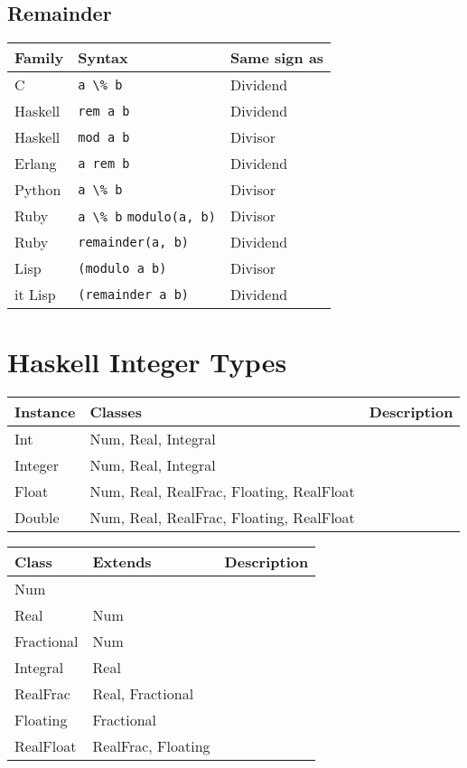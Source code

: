 \documentclass{article}
\begin{document}
\subsection{Remainder}
\begin{longtabu} to 0.75\linewidth { X X X }
	Family & Syntax & Same sign as \\
	\hline
	C & \lstinline$a \% b$ & Dividend \\
	Haskell & \lstinline$rem a b$ & Dividend \\
	Haskell & \lstinline$mod a b$ & Divisor \\
	Erlang & \lstinline$a rem b$ & Dividend \\
	Python & \lstinline$a \% b$ & Divisor \\
	Ruby & \lstinline$a \% b$ \newline \lstinline$modulo(a, b)$ & Divisor \\
	Ruby & \lstinline$remainder(a, b)$ & Dividend \\
	Lisp & \lstinline$(modulo a b)$ & Divisor \\it
	Lisp & \lstinline$(remainder a b)$ & Dividend \\

\end{longtabu}

\section{Haskell Integer Types}
\begin{longtabu} to 0.75\linewidth { X X X }
	Instance & Classes & Description \\
	\hline
	Int & Num, Real, Integral & \\
	Integer & Num, Real, Integral & \\
	Float & Num, Real, RealFrac, Floating, RealFloat & \\
	Double & Num, Real, RealFrac, Floating, RealFloat & \\
\end{longtabu}
\begin{longtabu} to 0.75\linewidth { X X X }
	Class & Extends & Description \\
	\hline
	Num & & \\
	Real & Num & \\
	Fractional & Num & \\
	Integral & Real & \\
	RealFrac & Real, Fractional & \\
	Floating & Fractional & \\
	RealFloat & RealFrac, Floating & \\
\end{longtabu}
\end{document}
